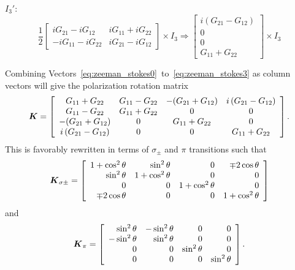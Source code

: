 $I_3'$:
\begin{equation}\label{eq:zeeman_stokes3}
 \frac{1}{2}\left[
\begin{array}{cc}
 iG_{21}-iG_{12}	&	iG_{11}+iG_{22}\\
-iG_{11}-iG_{22}	&	iG_{21}-iG_{12}
\end{array}
\right] \times I_3
 \Rightarrow
\left[
\begin{array}{c}
i(G_{21}-G_{12})\\
0\\
0\\
G_{11}+G_{22}
\end{array}
\right] \times I_3
\end{equation}

Combining Vectors~\ref{eq:zeeman_stokes0}~to~\ref{eq:zeeman_stokes3} as column vectors will give the polarization rotation matrix
\begin{equation}
 \mbox{\boldmath$K$} = \left[
\begin{array}{cccc}
G_{11}+G_{22}&G_{11}-G_{22}&-(G_{21}+G_{12})&i\left(G_{21}-G_{12}\right)\\
G_{11}-G_{22}&G_{11}+G_{22}&0&0\\
-(G_{21}+G_{12})&0&G_{11}+G_{22}&0\\
i\left(G_{21}-G_{12}\right)&0&0&G_{11}+G_{22}
\end{array}
\right].
\end{equation}
This is favorably rewritten in terms of $\sigma_\pm$ and $\pi$ transitions such that
\begin{equation}
 \mbox{\boldmath$K$}_{\sigma\pm} = \left[
\begin{array}{rrrr}
1+\cos^2\theta&\sin^2\theta&0&\mp2\cos\theta\\
\sin^2\theta&1+\cos^2\theta&0&0\\
0&0&1+\cos^2\theta&0\\
\mp2\cos\theta&0&0&1+\cos^2\theta
\end{array}
\right]
\end{equation}
and
\begin{equation}
 \mbox{\boldmath$K$}_{\pi} =
\left[
\begin{array}{rrrr}
\sin^2\theta&-\sin^2\theta&0&0\\
-\sin^2\theta&\sin^2\theta&0&0\\
0&0&\sin^2\theta&0\\
0&0&0&\sin^2\theta
\end{array}
\right].
\end{equation}

